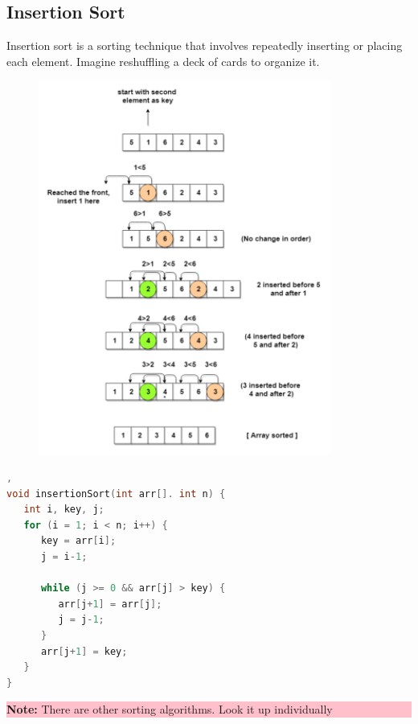 \subsection{Insertion Sort}
Insertion sort is a sorting technique that involves repeatedly inserting or placing each element. Imagine reshuffling a 
deck of cards to organize it.
\begin{figure}[H]
    \centering
    \includegraphics[width=0.5\linewidth]{../P4/img/screenshot007.png}
    \caption{}
    \label{fig:tujuh}
\end{figure}
\begin{lstlisting}[language=c,caption=Insertion Sort Implementation], 
void insertionSort(int arr[]. int n) {
   int i, key, j;
   for (i = 1; i < n; i++) {
      key = arr[i];
      j = i-1;
    
      while (j >= 0 && arr[j] > key) {
         arr[j+1] = arr[j];
         j = j-1;
      }
      arr[j+1] = key;
   }
}
\end{lstlisting}

\begin{center}
    \colorbox{pink}{\parbox{0.8\linewidth}{\textbf{Note:} There are other sorting algorithms. Look it up individually}}
\end{center}

